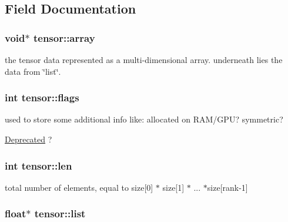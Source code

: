 \subsection{Field Documentation}
\hypertarget{structtensor_a981c1c095b7ef2970dce785c6658285d}{
\subsubsection[{array}]{\setlength{\rightskip}{0pt plus 5cm}void$\ast$ {\bf tensor::array}}}
\label{structtensor_a981c1c095b7ef2970dce785c6658285d}


the tensor data represented as a multi-\/dimensional array. underneath lies the data from \char`\"{}list\char`\"{}. 

\hypertarget{structtensor_a382032d59a44e7b1c6d85e545c6140cd}{
\subsubsection[{flags}]{\setlength{\rightskip}{0pt plus 5cm}int {\bf tensor::flags}}}
\label{structtensor_a382032d59a44e7b1c6d85e545c6140cd}


used to store some additional info like: allocated on RAM/GPU? symmetric? 

\begin{Desc}
\item[\hyperlink{deprecated__deprecated000005}{Deprecated}]? \end{Desc}
\hypertarget{structtensor_adebc092b0efc1c822fff1c722c65eb09}{
\subsubsection[{len}]{\setlength{\rightskip}{0pt plus 5cm}int {\bf tensor::len}}}
\label{structtensor_adebc092b0efc1c822fff1c722c65eb09}


total number of elements, equal to size\mbox{[}0\mbox{]} $\ast$ size\mbox{[}1\mbox{]} $\ast$ ... $\ast$size\mbox{[}rank-\/1\mbox{]} 

\hypertarget{structtensor_a6f3380b63c035b9627bdb6dcef03fc1b}{
\subsubsection[{list}]{\setlength{\rightskip}{0pt plus 5cm}float$\ast$ {\bf tensor::list}}}
\label{structtensor_a6f3380b63c035b9627bdb6dcef03fc1b}


